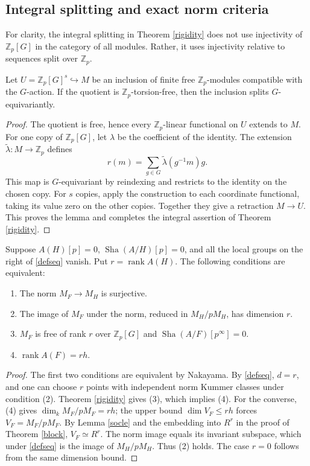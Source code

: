 \documentclass[11pt,a4paper]{article}
\newcommand{\Zp}{\mathbb Z_p}\newcommand{\Qp}{\mathbb Q_p}\newcommand{\Fp}{\mathbb F_p}\newcommand{\Q}{\mathbb Q}\newcommand{\Sha}{\operatorname{Sha}}\newcommand{\Sel}{\operatorname{Sel}}\newcommand{\Gal}{\operatorname{Gal}}\newcommand{\Tr}{\operatorname{Tr}}\newcommand{\rk}{\operatorname{rank}}\newcommand{\ord}{\operatorname{ord}}\newcommand{\Hom}{\operatorname{Hom}}\newcommand{\SL}{\operatorname{SL}}\newcommand{\GL}{\operatorname{GL}}\newcommand{\coker}{\operatorname{coker}}\newcommand{\length}{\operatorname{length}}\newcommand{\res}{\operatorname{res}}\newcommand{\cor}{\operatorname{cor}}\newcommand{\Id}{\operatorname{id}}
\numberwithin{equation}{section}
\begin{document}
\subsection{Integral splitting and exact norm criteria}
For clarity, the integral splitting in Theorem \ref{rigidity} does not use injectivity of $\Zp[G]$ in the category of all modules. Rather, it uses injectivity relative to sequences split over $\Zp$.
\begin{lemma}\label{relativeinj}
Let $U=\Zp[G]^s\hookrightarrow M$ be an inclusion of finite free $\Zp$-modules compatible with the $G$-action. If the quotient is $\Zp$-torsion-free, then the inclusion splits $G$-equivariantly.
\end{lemma}
\begin{proof}
The quotient is free, hence every $\Zp$-linear functional on $U$ extends to $M$. For one copy of $\Zp[G]$, let $\lambda$ be the coefficient of the identity. The extension $\widetilde\lambda:M\to\Zp$ defines
\[ r(m)=\sum_{g\in G}\widetilde\lambda(g^{-1}m)g. \]
This map is $G$-equivariant by reindexing and restricts to the identity on the chosen copy. For $s$ copies, apply the construction to each coordinate functional, taking its value zero on the other copies. Together they give a retraction $M\to U$. This proves the lemma and completes the integral assertion of Theorem \ref{rigidity}.
\end{proof}
\begin{corollary}\label{certificate}
Suppose $A(H)[p]=0$, $\Sha(A/H)[p]=0$, and all the local groups on the right of \eqref{defseq} vanish. Put $r=\rk A(H)$. The following conditions are equivalent:
\begin{enumerate}\setlength{\itemsep}{1pt}
\item The norm $M_F\to M_H$ is surjective.
\item The image of $M_F$ under the norm, reduced in $M_H/pM_H$, has dimension $r$.
\item $M_F$ is free of rank $r$ over $\Zp[G]$ and $\Sha(A/F)[p^\infty]=0$.
\item $\rk A(F)=rh$.
\end{enumerate}
\end{corollary}
\begin{proof}
The first two conditions are equivalent by Nakayama. By \eqref{defseq}, $d=r$, and one can choose $r$ points with independent norm Kummer classes under condition (2). Theorem \ref{rigidity} gives (3), which implies (4). For the converse, (4) gives $\dim_k M_F/pM_F=rh$; the upper bound $\dim V_F\le rh$ forces $V_F=M_F/pM_F$. By Lemma \ref{socle} and the embedding into $R^r$ in the proof of Theorem \ref{block}, $V_F\simeq R^r$. The norm image equals its invariant subspace, which under \eqref{defseq} is the image of $M_H/pM_H$. Thus (2) holds. The case $r=0$ follows from the same dimension bound.
\end{proof}
\end{document}
